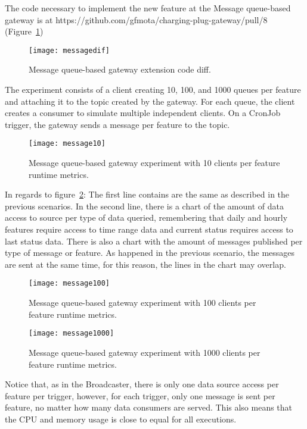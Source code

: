The code necessary to implement the new feature at the Message queue-based gateway is at https://github.com/gfmota/charging-plug-gateway/pull/8 (Figure~\ref{fig:messagedif})

\begin{figure}
    \centering
    \texttt{[image: messagedif]}
    \caption{Message queue-based gateway extension code diff.\label{fig:messagedif}}
\end{figure}

The experiment consists of a client creating 10, 100, and 1000 queues per feature and attaching it to the topic created by the gateway. For each queue, the client creates a consumer to simulate multiple independent clients. On a CronJob trigger, the gateway sends a message per feature to the topic.

\begin{figure}
    \centering
    \texttt{[image: message10]}
    \caption{Message queue-based gateway experiment with 10 clients per feature runtime metrics.\label{fig:message10}}
\end{figure}

In regards to figure~\ref{fig:message10}: The first line contains are the same as described in the previous scenarios. In the second line, there is a chart of the amount of data access to source per type of data queried, remembering that daily and hourly features require access to time range data and current status requires access to last status data. There is also a chart with the amount of messages published per type of message or feature. As happened in the previous scenario, the messages are sent at the same time, for this reason, the lines in the chart may overlap.

\begin{figure}
    \centering
    \texttt{[image: message100]}
    \caption{Message queue-based gateway experiment with 100 clients per feature runtime metrics.\label{fig:message100}}
\end{figure}

\begin{figure}
    \centering
    \texttt{[image: message1000]}
    \caption{Message queue-based gateway experiment with 1000 clients per feature runtime metrics.\label{fig:message1000}}
\end{figure}

Notice that, as in the Broadcaster, there is only one data source access per feature per trigger, however, for each trigger, only one message is sent per feature, no matter how many data consumers are served. This also means that the CPU and memory usage is close to equal for all executions.

